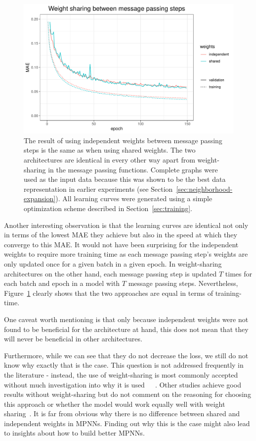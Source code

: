 \begin{figure}[H]
	\includegraphics[width=\linewidth]{figures/weight-sharing.pdf}
	\caption{The result of using independent weights between message passing steps is the same as when using shared weights. The two architectures are identical in every other way apart from weight-sharing in the message passing functions. Complete graphs were used as the input data because this was shown to be the best data representation in earlier experiments (see Section~\ref{sec:neighborhood-expansion}). All learning curves were generated using a simple optimization scheme described in Section~\ref{sec:training}.}
	\label{fig:weight-sharing}
\end{figure}


Another interesting observation is that the learning curves are identical not only in terms of the lowest MAE they achieve but also in the speed at which they converge to this MAE. It would not have been surprising for the independent weights to require more training time as each message passing step's weights are only updated once for a given batch in a given epoch. In weight-sharing architectures on the other hand, each message passing step is updated $T$ times for each batch and epoch in a model with $T$ message passing steps. Nevertheless, Figure~\ref{fig:weight-sharing} clearly shows that the two approaches are equal in terms of training-time.

One caveat worth mentioning is that only because independent weights were not found to be beneficial for the architecture at hand, this does not mean that they will never be beneficial in other architectures.

Furthermore, while we can see that they do not decrease the loss, we still do not know why exactly that is the case. This question is not addressed frequently in the literature - instead, the use of weight-sharing is most commonly accepted without much investigation into why it is used~\cite{Chen2019}~\cite{Schutt2017}~\cite{Klicpera2019}. Other studies achieve good results without weight-sharing but do not comment on the reasoning for choosing this approach or whether the model would work equally well with weight sharing~\cite{Jørgensen2018}. It is far from obvious why there is no difference between shared and independent weights in MPNNs. Finding out why this is the case might also lead to insights about how to build better MPNNs.  

